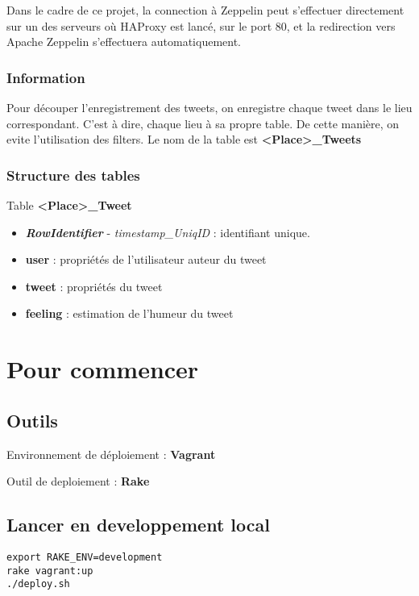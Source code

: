 \documentclass[a4paper,oneside,12pt]{article}
\begin{document}
Dans le cadre de ce projet, la connection à Zeppelin peut s'effectuer directement
sur un des serveurs où HAProxy est lancé, sur le port 80, et la redirection vers
Apache Zeppelin s'effectuera automatiquement.


\subsubsection{Information}

Pour découper l'enregistrement des tweets, on enregistre chaque tweet dans le lieu correspondant. C'est à dire, chaque lieu à sa propre table. De cette manière, on evite l'utilisation des filters. Le nom de la table est \textbf{<Place>\_Tweets}

\subsubsection{Structure des tables}

Table \textbf{<Place>\_Tweet}
\begin{itemize}
\item \textbf{\textit{RowIdentifier}} - \textit{timestamp\_UniqID} : identifiant unique.
\item \textbf{user} : propriétés de l'utilisateur auteur du tweet
\item \textbf{tweet} : propriétés du tweet
\item \textbf{feeling} : estimation de l'humeur du tweet
\end{itemize}

\pagebreak

\section{Pour commencer}

\subsection{Outils}

Environnement de déploiement : \textbf{Vagrant}

Outil de deploiement : \textbf{Rake}

\subsection{Lancer en developpement local}

\begin{verbatim}
export RAKE_ENV=development
rake vagrant:up
./deploy.sh
\end{verbatim}
\end{document}
